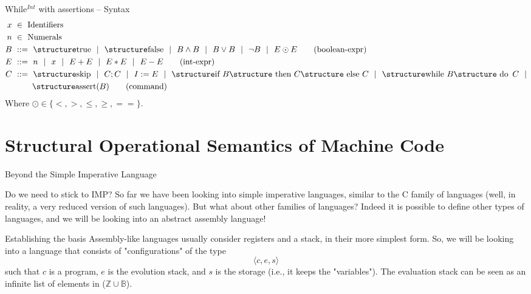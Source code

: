 \documentclass[aspectratio=169]{beamer}
\begin{document}
\begin{slide}{While$^{Int}$ with assertions -- Syntax}
\small
\begin{align*}
  x &~\in~ \text{Identifiers}
  \\
  n &~\in~ \text{Numerals}
  \\
  B &~::=~ \kw{true} ~~|~~ \kw{false} ~~|~~ B \land B ~~|~~ B \lor B ~~|~~ \lnot B ~~|~~ E \odot E
  \tag{boolean-expr}\\
  E &~::=~ n ~~|~~ x ~~|~~ E+E ~~|~~ E*E ~~|~~ E-E
  \tag{int-expr}\\
  C &~::=~ \kw {skip} ~~|~~ C;C ~~|~~ I:=E
    ~~|~~  \kw{if } B \kw{ then } C\kw{ else }C ~~|~~  \kw{while }B\kw{ do }\,C ~~|\\
    &\:\:\:\:\:\:\:\:\:\:\:\kw{assert}(B)\tag{command}\\
\end{align*}
Where $\odot \in \{<,>,\le,\ge,==\}$.
\end{slide}

\section{Structural Operational Semantics of Machine Code}

\begin{slide}{Beyond the Simple Imperative Language}
\begin{block}{Do we need to stick to IMP?}
So far we have been looking into simple imperative languages, similar to the C family of languages (well, in reality, a very reduced version of such languages). But what about other families of languages? Indeed it is possible to define other types of languages, and we will be looking into an abstract assembly language!
\end{block}

\begin{block}{Establishing the basis}
Assembly-like languages usually consider registers and a stack, in their more simplest form. So, we will be looking into a language that consists of "configurations" of the type $$\langle c,e,s\rangle$$ such that $c$ is a program, $e$ is the evolution stack, and $s$ is the storage (i.e., it keeps the "variables"). The evaluation stack can be seen as an infinite list of elements in ($\mathbb{Z} \cup \mathbb{B}$).
\end{block}
\end{slide}
\end{document}
